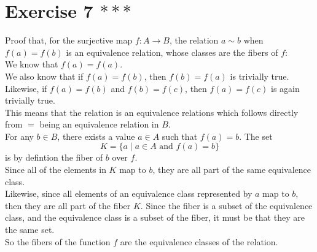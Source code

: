 \documentclass[12pt]{article}
\begin{document}
    \section*{Exercise 7 $***$}
    Proof that, for the surjective map $f: A \to B$,
    the relation $a \sim b$ when $f(a) = f(b)$
    is an equivalence relation,
    whose classes are the fibers of $f$: \\
    We know that $f(a) = f(a)$. \\
    We also know that if $f(a) = f(b)$,
    then $f(b) = f(a)$ is trivially true. \\
    Likewise,
    if $f(a) = f(b)$ and $f(b) = f(c)$,
    then $f(a) = f(c)$ is again trivially true. \\
    This means that the relation is an equivalence relations
    which follows directly from $=$
    being an equivalence relation in $B$. \\
    For any $b \in B$,
    there exists a value $a \in A$ such that $f(a) = b$.
    The set
    \[ K = \{ a \mid a \in A \text{ and } f(a) = b \} \]
    is by defintion the fiber of $b$ over $f$. \\
    Since all of the elements in $K$ map to $b$,
    they are all part of the same equivalence class. \\
    Likewise, since all elements of an equivalence class
    represented by $a$ map to $b$,
    then they are all part of the fiber $K$.
    Since the fiber is a subset of the equivalence class,
    and the equivalence class is a subset of the fiber,
    it must be that they are the same set. \\
    So the fibers of the function $f$
    are the equivalence classes of the relation. \\
\end{document}
